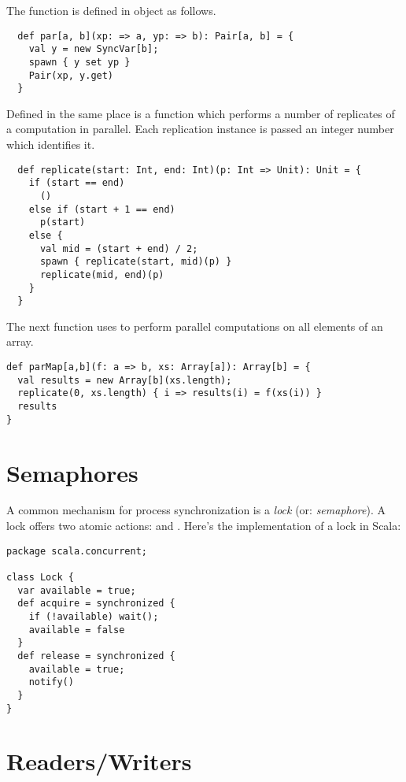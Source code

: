 {The function is defined in object
 as follows.
\begin{lstlisting}
  def par[a, b](xp: => a, yp: => b): Pair[a, b] = {
    val y = new SyncVar[b];
    spawn { y set yp }
    Pair(xp, y.get)
  }
\end{lstlisting}
Defined in the same place is a function  which performs a
number of replicates of a computation in parallel. Each
replication instance is passed an integer number which identifies it.
\begin{lstlisting}
  def replicate(start: Int, end: Int)(p: Int => Unit): Unit = {
    if (start == end) 
      ()
    else if (start + 1 == end)
      p(start)
    else {
      val mid = (start + end) / 2;
      spawn { replicate(start, mid)(p) }
      replicate(mid, end)(p)
    }
  }
\end{lstlisting}

The next function uses  to perform parallel
computations on all elements of an array.

\begin{lstlisting}
def parMap[a,b](f: a => b, xs: Array[a]): Array[b] = {
  val results = new Array[b](xs.length);
  replicate(0, xs.length) { i => results(i) = f(xs(i)) }
  results
}
\end{lstlisting}

\section{Semaphores}

A common mechanism for process synchronization is a {\em lock} (or:
{\em semaphore}). A lock offers two atomic actions:  and
. Here's the implementation of a lock in Scala:

\begin{lstlisting}
package scala.concurrent;

class Lock {
  var available = true;
  def acquire = synchronized {
    if (!available) wait();
    available = false
  }
  def release = synchronized {
    available = true;
    notify()
  }
}
\end{lstlisting}

\section{Readers/Writers}

}

